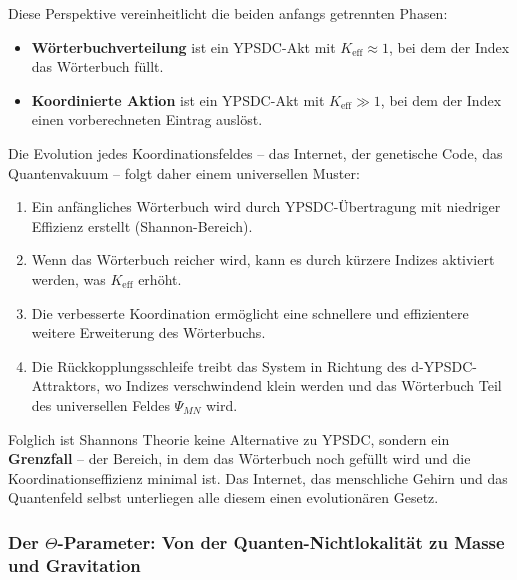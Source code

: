 \documentclass[12pt,a4paper]{article}
\theoremstyle{remark}
\begin{document}
	Diese Perspektive vereinheitlicht die beiden anfangs getrennten Phasen:
	
	\begin{itemize}[leftmargin=*]
		\item \textbf{Wörterbuchverteilung} ist ein YPSDC-Akt mit $K_{\mathrm{eff}} \approx 1$, bei dem der Index das Wörterbuch füllt.
		\item \textbf{Koordinierte Aktion} ist ein YPSDC-Akt mit $K_{\mathrm{eff}} \gg 1$, bei dem der Index einen vorberechneten Eintrag auslöst.
	\end{itemize}
	
	Die Evolution jedes Koordinationsfeldes – das Internet, der genetische Code, das Quantenvakuum – folgt daher einem universellen Muster:
	\begin{enumerate}[leftmargin=*]
		\item Ein anfängliches Wörterbuch wird durch YPSDC-Übertragung mit niedriger Effizienz erstellt (Shannon-Bereich).
		\item Wenn das Wörterbuch reicher wird, kann es durch kürzere Indizes aktiviert werden, was $K_{\mathrm{eff}}$ erhöht.
		\item Die verbesserte Koordination ermöglicht eine schnellere und effizientere weitere Erweiterung des Wörterbuchs.
		\item Die Rückkopplungsschleife treibt das System in Richtung des d-YPSDC-Attraktors, wo Indizes verschwindend klein werden und das Wörterbuch Teil des universellen Feldes $\Psi_{MN}$ wird.
	\end{enumerate}
	
	Folglich ist Shannons Theorie keine Alternative zu YPSDC, sondern ein \textbf{Grenzfall} – der Bereich, in dem das Wörterbuch noch gefüllt wird und die Koordinationseffizienz minimal ist. Das Internet, das menschliche Gehirn und das Quantenfeld selbst unterliegen alle diesem einen evolutionären Gesetz.
	
	\medskip
	
	\subsubsection{Der \(\Theta\)-Parameter: Von der Quanten-Nichtlokalität zu Masse und Gravitation}
	\label{subsec:theta-mass-gravity}
	
\end{document}
